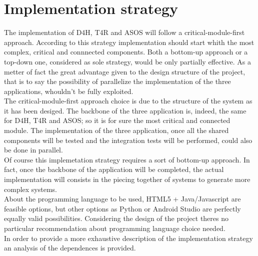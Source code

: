 
\section{Implementation strategy }

The implementation of D4H, T4R and ASOS will follow a critical-module-first approach. According to this strategy implementation should start whith the most complex, critical and connnected components. Both a bottom-up approach or a top-down one, considered as sole strategy, would be only partially effective. As a metter of fact the great advantage given to the design structure of the project, that is to say the possibility of parallelize the implementation of the three applications, whouldn't be fully exploited.\\ The critical-module-first approach choice is due to the structure of the system as it has been desiged. The backbone of the three application is, indeed, the same for D4H, T4R and ASOS; so it is for sure the most critical and connected module. The implementation of the three application, once all the shared components will be tested and the integration tests will be performed, could also be done in parallel. \\ Of course this implemetation strategy requires a sort of bottom-up approach. In fact, once the backbone of the application will be completed, the actual implementation will consists in the piecing together of systems to generate more complex systems. \\ About the programming language to be used, HTML5 + Java/Javascript are feasible options, but other options as Python or Android Studio are perfectly equally valid possibilities. Considering the design of the project theres no particular recommendation about programming language choice needed. \\ In order to provide a more exhaustive description of the implementation strategy an analysis of the dependences is provided.
